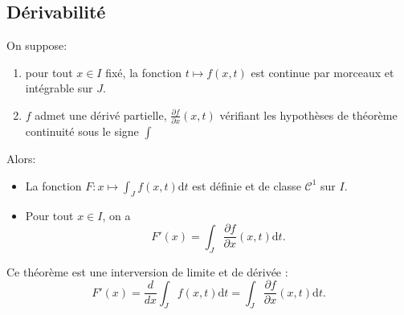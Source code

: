 \documentclass{book}
\begin{document}
\subsection{Dérivabilité}
\begin{Theoreme}
On suppose:
\begin{enumerate}
\item
   pour tout $x\in I$ fixé, la fonction $t \mapsto f(x,t)$
    est continue par morceaux et intégrable sur $J$.
\item $f$ admet une dérivé partielle, $\frac{\partial f}{\partial x} (x,t)$ vérifiant les hypothèses de théorème continuité sous le signe $\int$ 
\end{enumerate}
Alors:
\begin{itemize}
\item
  La fonction $F \colon x \mapsto \int_J f(x,t) \mathrm dt$ est définie et de classe $\mathcal{C}^1$ sur $I$.
\item
  Pour tout $x\in I$, on a \[  F'(x) = \int_J \frac{\partial f}{\partial x} (x,t) \mathrm dt. \]
\end{itemize}
\end{Theoreme}
\begin{Remarque}
Ce théorème est une interversion de limite et de dérivée :
$$F'(x)=\frac{d}{dx} \int_J f(x,t)\mathrm dt = \int_J \frac{\partial f}{\partial x }(x,t) \mathrm dt.$$
\end{Remarque}
\end{document}
